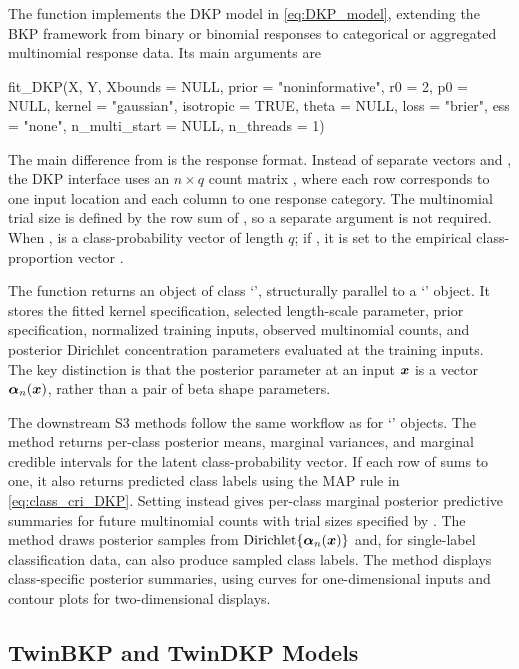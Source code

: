 \documentclass[article, shortnames]{jss}
\newcommand{\class}[1]{`\code{#1}'}
\newcommand{\fct}[1]{\code{#1()}}
\renewcommand{\vec}[1]{\mbox{\boldmath ${#1}$}}
\begin{document}
The function \fct{fit\_DKP} implements the DKP model in \eqref{eq:DKP_model}, extending the BKP framework from binary or binomial responses to categorical or aggregated multinomial response data. Its main arguments are
\begin{Code}
fit_DKP(X, Y, Xbounds = NULL,
	prior = "noninformative", r0 = 2, p0 = NULL,
	kernel = "gaussian", isotropic = TRUE, theta = NULL,
	loss = "brier", ess = "none", n_multi_start = NULL, n_threads = 1)
\end{Code}
The main difference from \fct{fit\_BKP} is the response format. Instead of separate vectors  and , the DKP interface uses an $n \times q$ count matrix , where each row corresponds to one input location and each column to one response category. The multinomial trial size is defined by the row sum of , so a separate  argument is not required. When ,  is a class-probability vector of length $q$; if , it is set to the empirical class-proportion vector .

The function returns an object of class \class{DKP}, structurally parallel to a \class{BKP} object. It stores the fitted kernel specification, selected length-scale parameter, prior specification, normalized training inputs, observed multinomial counts, and posterior Dirichlet concentration parameters evaluated at the training inputs. The key distinction is that the posterior parameter at an input $\vec{x}$ is a vector $\vec{\alpha}_n(\vec{x})$, rather than a pair of beta shape parameters.

The downstream S3 methods follow the same workflow as for \class{BKP} objects. The \fct{predict} method returns per-class posterior means, marginal variances, and marginal credible intervals for the latent class-probability vector. If each row of  sums to one, it also returns predicted class labels using the MAP rule in \eqref{eq:class_cri_DKP}. Setting  instead gives per-class marginal posterior predictive summaries for future multinomial counts with trial sizes specified by . The \fct{simulate} method draws posterior samples from $\mathrm{Dirichlet}\{\vec{\alpha}_n(\vec{x})\}$ and, for single-label classification data, can also produce sampled class labels. The \fct{plot} method displays class-specific posterior summaries, using curves for one-dimensional inputs and contour plots for two-dimensional displays.

\subsection{TwinBKP and TwinDKP Models}\label{sec:Twin_pkg}
\end{document}
